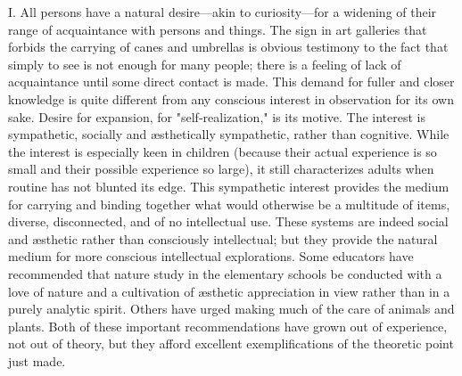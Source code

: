 \documentclass[showtrims,ustradepaper]{memoir}
\begin{document}

I. All persons have a natural desire---akin to curiosity---for a
widening of their range of acquaintance with persons and things. The
sign in art galleries that forbids the carrying of canes and umbrellas
is obvious testimony to the fact that simply to see is not enough for
many people; there is a feeling of lack of acquaintance until some
direct contact is made. This demand for fuller and closer knowledge is
quite different from any conscious interest in observation for its own
sake. Desire for expansion, for "self-realization," is its motive. The
interest is sympathetic, socially and æsthetically sympathetic, rather
than cognitive. While the interest is especially keen in children
(because their actual experience is so small and their possible
experience so large), it still characterizes adults when routine has not
blunted its edge. This sympathetic interest provides the medium for
carrying and binding together what would otherwise be a multitude of
items, diverse, disconnected, and of no intellectual use. These systems
are indeed social and æsthetic rather than consciously
intellectual;
but they provide the natural medium for more conscious intellectual
explorations. Some educators have recommended that nature study in the
elementary schools be conducted with a love of nature and a cultivation
of æsthetic appreciation in view rather than in a purely analytic
spirit. Others have urged making much of the care of animals and plants.
Both of these important recommendations have grown out of experience,
not out of theory, but they afford excellent exemplifications of the
theoretic point just made.


\end{document}

